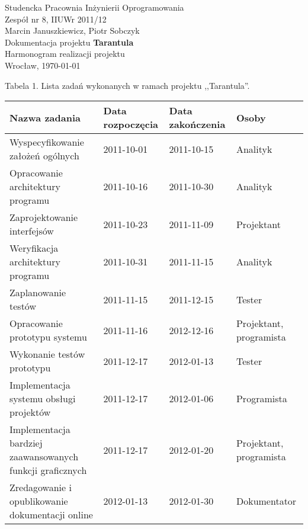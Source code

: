 \documentclass[11pt,leqno]{article}
\begin{document}
\begin{center}
\thispagestyle{empty}
{\Large Studencka Pracownia Inżynierii Oprogramowania}\\[0.5cm]
{\Large Zespół nr 8, IIUWr 2011/12}\\[2.5cm]

{\large Marcin Januszkiewicz, Piotr Sobczyk}\\[0.5cm]
{\huge Dokumentacja projektu \textbf{Tarantula}}\\[0.5cm]
{\huge Harmonogram realizacji projektu}\\[0.5cm]
\vfill
{\large Wrocław, \today}

\end{center}

\newpage
\newpage

\begin{landscape}
{\small Tabela 1. Lista zadań wykonanych w ramach projektu ,,Tarantula''.}
\\[0.3cm]
\begin{tabular}{|p{10cm}|l|l|l|}
\hline
\bf{Nazwa zadania} & \bf{Data rozpoczęcia} & \bf{Data zakończenia} & \bf{Osoby} \\ \hline
Wyspecyfikowanie założeń ogólnych & 2011-10-01 & 2011-10-15 & Analityk \\ \hline
Opracowanie architektury programu & 2011-10-16 & 2011-10-30 & Analityk \\ \hline
Zaprojektowanie interfejsów & 2011-10-23 & 2011-11-09 & Projektant \\ \hline
Weryfikacja architektury programu & 2011-10-31 & 2011-11-15 & Analityk \\ \hline
Zaplanowanie testów & 2011-11-15 & 2011-12-15 & Tester \\ \hline
Opracowanie prototypu systemu & 2011-11-16 & 2012-12-16 & Projektant, programista \\ \hline
Wykonanie testów prototypu & 2011-12-17 & 2012-01-13 & Tester \\ \hline
Implementacja systemu obsługi projektów & 2011-12-17 & 2012-01-06 & Programista \\ \hline
Implementacja bardziej zaawansowanych funkcji graficznych & 2011-12-17 & 2012-01-20 & Projektant, programista \\ \hline
Zredagowanie i opublikowanie dokumentacji online & 2012-01-13 & 2012-01-30 & Dokumentator \\ \hline
\end{tabular}


\end{landscape}
\end{document}

